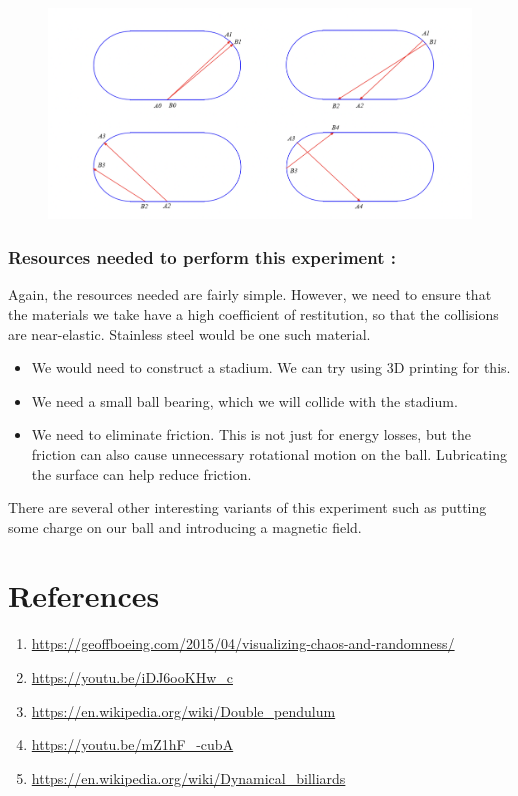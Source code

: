 \documentclass{article}
\begin{document}
\begin{figure}[h]
    \centering
    \includegraphics[scale = 0.50]{billiards}
\end{figure}
\subsubsection*{Resources needed to perform this experiment :}
Again, the resources needed are fairly simple. However, we need to ensure that the materials we take have a high coefficient of restitution, so that the collisions are near-elastic. Stainless steel would be one such material.
\begin{itemize}
    \item We would need to construct a stadium. We can try using 3D printing for this.
    \item We need a small ball bearing, which we will collide with the stadium.
    \item We need to eliminate friction. This is not just for energy losses, but the friction can also cause unnecessary rotational motion on the ball. Lubricating the surface can help reduce friction.
\end{itemize}
There are several other interesting variants of this experiment such as putting some charge on our ball and introducing a magnetic field.
\section*{References}

\begin{enumerate}

\item \url{https://geoffboeing.com/2015/04/visualizing-chaos-and-randomness/}

\item \url{https://youtu.be/iDJ6ooKHw_c}

\item \url{https://en.wikipedia.org/wiki/Double_pendulum}

\item \url{https://youtu.be/mZ1hF_-cubA}

\item \url{https://en.wikipedia.org/wiki/Dynamical_billiards}


\end{enumerate}
\end{document}
